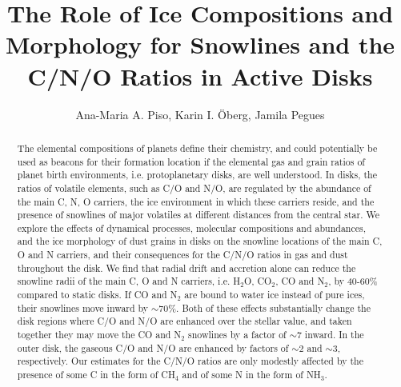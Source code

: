 \documentclass[apj]{emulateapj}
\begin{document}


\title{The Role of Ice Compositions and Morphology for Snowlines and the C/N/O Ratios in Active Disks}

\author{Ana-Maria A. Piso, Karin I. \"Oberg, Jamila Pegues}


\begin{abstract}
The elemental compositions of planets define their chemistry, and could potentially be used as beacons for their formation location if the elemental gas and grain ratios of planet birth environments, i.e. protoplanetary disks, are well understood. In disks, the ratios of volatile elements, such as C/O and N/O, are regulated by the abundance of the main C, N, O carriers, the ice environment in which these carriers reside, and the presence of snowlines of major volatiles at different distances from the central star. We explore the effects of dynamical processes, molecular compositions and abundances, and the ice morphology of dust grains in disks on the snowline locations of the main C, O and N carriers, and their consequences for the C/N/O ratios in gas and dust throughout the disk. We find that radial drift and accretion alone can reduce the snowline radii of the main C, O and N carriers, i.e. H$_2$O, CO$_2$, CO and N$_2$, by 40-60\% compared to static disks. If CO and N$_2$ are bound to water ice instead of pure ices, their snowlines move inward by $\sim$$70$\%. Both of these effects substantially change the disk regions where C/O and N/O are enhanced over the stellar value, and taken together they may move the CO and N$_2$ snowlines by a factor of $\sim$7 inward. In the outer disk, the gaseous C/O and N/O are enhanced by factors of $\sim$$2$ and $\sim$$3$, respectively. Our estimates for the C/N/O ratios are only modestly affected by the presence of some C in the form of CH$_4$ and of some N in the form of NH$_3$.  

\end{abstract}
\end{document}
